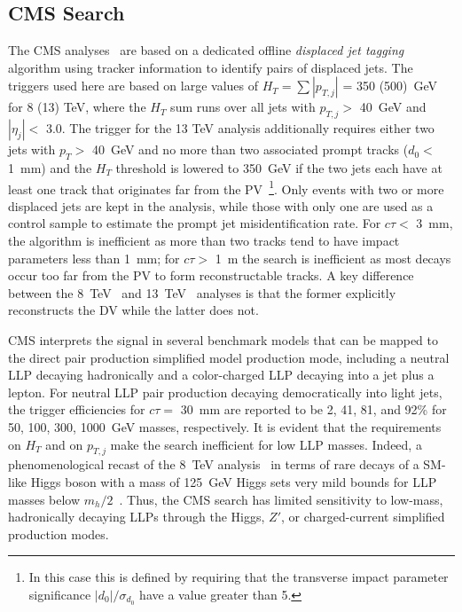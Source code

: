 \subsection{CMS Search}

The CMS analyses~\cite{Aad:2015rba,Sirunyan:2017jdo} are based on a dedicated offline \emph{displaced jet tagging} algorithm using tracker information to identify pairs of displaced jets. The triggers used here are based on large values of $H_T = \sum |p_{T,j}|$ = 350 (500)~GeV for 8 (13) TeV, where the $H_T$ sum runs over all jets with $p_{T,j} >$ 40~GeV and $|\eta_j| <$ 3.0. The trigger for the 13 TeV analysis additionally requires either two jets with $p_T >$ 40~GeV and no more than two associated prompt tracks ($d_0 <$ 1~mm) and the $H_T$ threshold is lowered to 350~GeV if the two jets each have at least one track that originates far from the PV~\footnote{In this case this is defined by requiring that the transverse impact parameter significance $|d_0|/\sigma_{d_0}$ have a value greater than 5.}. Only events with two or more displaced jets are kept in the analysis, while those with only one are used as a control sample to estimate the prompt jet misidentification rate. For $c \tau <$ 3~mm, the algorithm is inefficient as more than two tracks tend to have impact parameters less than 1~mm; for $c \tau >$ 1~m the search is inefficient as most decays occur too far from the PV to form reconstructable tracks. A key difference between the 8~TeV~\cite{Khachatryan:2015wka} and 13~TeV~\cite{Sirunyan:2017jdo} analyses is that the former explicitly reconstructs the DV while the latter does not.

CMS interprets the signal in several benchmark models that can be mapped to the direct pair production simplified model production mode, including a neutral LLP decaying hadronically and a color-charged LLP decaying into a jet plus a lepton. For neutral LLP pair production decaying democratically into light jets, the trigger efficiencies for $c \tau =$ 30~mm are reported to be 2, 41, 81, and 92\% for 50, 100, 300, 1000~GeV masses, respectively. It is evident that the requirements on $H_T$ and on $p_{T,j}$ make the search inefficient for low LLP masses. Indeed, a phenomenological recast of the 8~TeV analysis~\cite{CMS:2014wda} in terms of rare decays of a SM-like Higgs boson with a mass of 125~GeV Higgs sets very mild bounds for LLP masses below $m_h / 2$~\cite{Csaki:2015fba}. Thus, the CMS search has limited sensitivity to low-mass, hadronically decaying LLPs through the Higgs, $Z'$, or charged-current simplified production modes.


